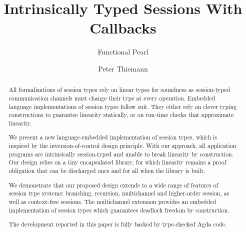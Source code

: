 \documentclass[acmsmall,screen]{acmart}
\begin{document}
\title{Intrinsically Typed Sessions With Callbacks}
\subtitle{Functional Pearl}

\author{Peter Thiemann}


\begin{abstract}
All formalizations of session types rely on linear types for soundness as
session-typed communication channels must change their type at every
operation. Embedded language implementations of session types follow
suit. They either rely on clever typing constructions to guarantee
linearity statically, or on run-time checks that approximate
linearity.

We present a new language-embedded implementation of session types,
which is inspired by the inversion-of-control design principle. With
our approach, all application programs are intrinsically session-typed and
unable to break linearity by construction. Our design relies on a tiny
encapsulated library, for which linearity remains a proof
obligation that can be discharged once and for all when the library is built.

We demonstrate that our proposed design extends to a wide range of
features of session type systems: branching, recursion, multichannel
and higher-order session, as well as context-free sessions. The
multichannel extension provides an embedded implementation of
session types which guarantees deadlock freedom by construction.

The development reported in this paper is fully backed by
type-checked Agda code.
\end{abstract}
\end{document}
